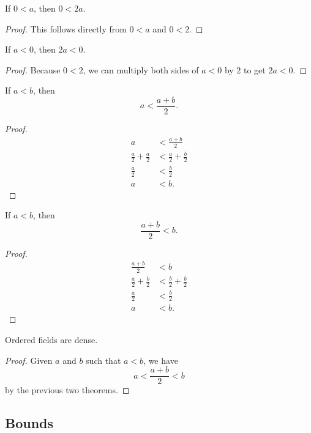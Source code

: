\documentclass[../math.tex]{subfiles}
\begin{document}
\begin{theorem}
    If $0 < a$, then $0 < 2a$.
\end{theorem}
\begin{proof}
    This follows directly from $0 < a$ and $0 < 2$.
\end{proof}

\begin{theorem}
    If $a < 0$, then $2a < 0$.
\end{theorem}
\begin{proof}
    Because $0 < 2$, we can multiply both sides of $a < 0$ by $2$ to get $2a <
    0$.
\end{proof}

\begin{theorem}
    If $a < b$, then
    \[
        a < \frac{a + b}{2}.
    \]
\end{theorem}
\begin{proof}
    \begin{align*}
        a &< \frac{a + b}{2} \\
        \frac{a}{2} + \frac{a}{2} &< \frac{a}{2} + \frac{b}{2} \\
        \frac{a}{2} &< \frac{b}{2} \\
        a &< b.
    \end{align*}
\end{proof}

\begin{theorem}
    If $a < b$, then
    \[
        \frac{a + b}{2} < b.
    \]
\end{theorem}
\begin{proof}
    \begin{align*}
        \frac{a + b}{2} &< b \\
        \frac{a}{2} + \frac{b}{2} &< \frac{b}{2} + \frac{b}{2} \\
        \frac{a}{2} &< \frac{b}{2} \\
        a &< b.
    \end{align*}
\end{proof}

\begin{instance}
    Ordered fields are dense.
\end{instance}
\begin{proof}
    Given $a$ and $b$ such that $a < b$, we have
    \[
        a < \frac{a + b}{2} < b
    \]
    by the previous two theorems.
\end{proof}

\subsection{Bounds}
\end{document}
